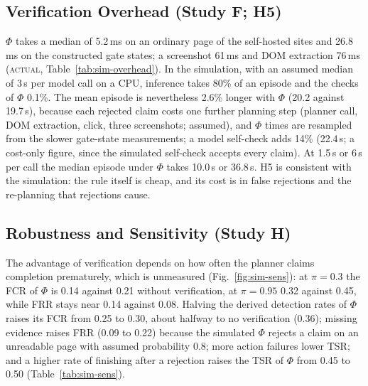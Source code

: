 \subsection{Verification Overhead (Study F; H5)}



$\Phi$ takes a median of 5.2\,ms on an ordinary page of the self-hosted sites and 26.8\,ms on the constructed gate states; a screenshot 61\,ms and DOM extraction 76\,ms (\textsc{actual}, Table~\ref{tab:sim-overhead}). In the simulation, with an assumed median of 3\,s per model call on a CPU, inference takes 80\% of an episode and the checks of $\Phi$ 0.1\%. The mean episode is nevertheless 2.6\% longer with $\Phi$ (20.2 against 19.7\,s), because each rejected claim costs one further planning step (planner call, DOM extraction, click, three screenshots; assumed), and $\Phi$ times are resampled from the slower gate-state measurements; a model self-check adds 14\% (22.4\,s; a cost-only figure, since the simulated self-check accepts every claim). At 1.5\,s or 6\,s per call the median episode under $\Phi$ takes 10.0\,s or 36.8\,s. H5 is consistent with the simulation: the rule itself is cheap, and its cost is in false rejections and the re-planning that rejections cause.

\subsection{Robustness and Sensitivity (Study H)}



The advantage of verification depends on how often the planner claims completion prematurely, which is unmeasured (Fig.~\ref{fig:sim-sens}): at $\pi=0.3$ the FCR of $\Phi$ is 0.14 against 0.21 without verification, at $\pi=0.95$ 0.32 against 0.45, while FRR stays near 0.14 against 0.08. Halving the derived detection rates of $\Phi$ raises its FCR from 0.25 to 0.30, about halfway to no verification (0.36); missing evidence raises FRR (0.09 to 0.22) because the simulated $\Phi$ rejects a claim on an unreadable page with assumed probability 0.8; more action failures lower TSR; and a higher rate of finishing after a rejection raises the TSR of $\Phi$ from 0.45 to 0.50 (Table~\ref{tab:sim-sens}).
